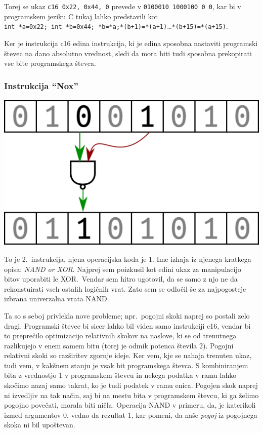 \documentclass[12pt]{article}
\begin{document}
Torej se ukaz \verb|c16 0x22, 0x44, 0| prevede v \verb|0100010 1000100 0 0|, kar bi v programskem jeziku C tukaj lahko predstavili kot \\
\verb|int *a=0x22; int *b=0x44; *b=*a;*(b+1)=*(a+1)|\ldots \verb|*(b+15)=*(a+15)|.

Ker je instrukcija c16 edina instrukcija, ki je edina sposobna nastaviti programski števec na dano absolutno vrednost, sledi da mora biti tudi sposobna prekopirati vse bite programskega števca.

\subsubsection{Instrukcija ``Nox''}

\begin{center}
  \includegraphics[width=.3\linewidth]{slike/predstavitev/nand.png}
\end{center}

To je 2.\ instrukcija, njena operacijska koda je $1$.
Ime izhaja iz njenega kratkega opisa: \textit{NAND or XOR}.
Najprej sem poizkusil kot edini ukaz za manipulacijo bitov uporabiti le XOR.\
Vendar sem hitro ugotovil, da se samo z njo ne da rekonstuirati vseh ostalih logičnih vrat.
Zato sem se odločil še za najpogosteje izbrana univerzalna vrata NAND.\@

Ta so s seboj privlekla nove probleme; npr.\ pogojni skoki naprej so postali zelo dragi.
Programski števec bi sicer lahko bil viden samo instrukciji c16, vendar bi to preprečilo optimizacijo relativnih skokov na naslove, ki se od trenutnega razlikujejo v enem samem bitu (torej je odmik potenca števila 2).
Pogojni relativni skoki so razširitev zgornje ideje.
Ker vem, kje se nahaja trenuten ukaz, tudi vem, v kakšnem stanju je vsak bit programskega števca.
S kombiniranjem bita z vrednostjo 1 v programskem števcu in nekega podatka v ramu lahko skočimo nazaj samo takrat, ko je tudi podatek v ramu enica.
Pogojen skok naprej ni izvedljiv na tak način, saj bi na mestu bita v programskem števcu, ki ga želimo pogojno povečati, morala biti ničla.
Operacija NAND v primeru, da, je katerikoli izmed argumentov 0, vedno da rezultat 1, kar pomeni, da naše \textit{pogoj} iz pogojnega skoka ni bil upoštevan.
\end{document}
